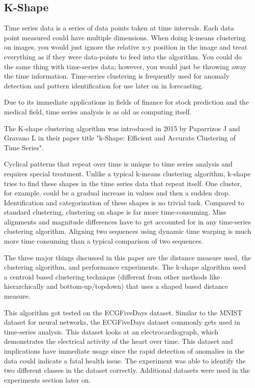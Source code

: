 \documentclass[12pt]{apa6}
\begin{document}
\subsection{K-Shape}


Time series data is a series of data points taken at time intervals. Each data point measured could have multiple dimensions. When doing k-means clustering on images, you would just ignore the relative x-y position in the image and treat everything as if they were data-points to feed into the algorithm. You could do the same thing with time-series data; however, you would just be throwing away the time information. Time-series clustering is frequently used for anomaly detection and pattern identification for use later on in forecasting. 


Due to its immediate applications in fields of finance for stock prediction and the medical field, time series analysis is as old as computing itself.  


The K-shape clustering algorithm was introduced in 2015 by Paparrizos J and Gravano L in their paper title "k-Shape: Efficient and Accurate Clustering of Time Series"\cite{k-shape}. 

Cyclical patterns that repeat over time is unique to time series analysis and requires special treatment. Unlike a typical k-means clustering algorithm, k-shape tries to find these shapes in the time series data that repeat itself. One cluster, for example, could be a gradual increase in values and then a sudden drop. Identification and categorization of these shapes is no trivial task. Compared to standard clustering, clustering on shape is far more time-consuming. Miss alignments and magnitude differences have to get accounted for in any time-series clustering algorithm. Aligning two sequences using dynamic time warping is much more time consuming than a typical comparison of two sequences.


The three major things discussed in this paper are the distance measure used, the clustering algorithm, and performance experiments. The k-shape algorithm used a centroid based clustering technique (different from other methods like hierarchically and bottom-up/topdown) that uses a shaped based distance measure. 


This algorithm got tested on the ECGFiveDays dataset. Similar to the MNIST dataset for neural networks, the ECGFiveDays dataset commonly gets used in time-series analysis. This dataset looks at an electrocardiograph, which demonstrates the electrical activity of the heart over time. This dataset and implications have immediate usage since the rapid detection of anomalies in the data could indicate a fatal health issue. The experiment was able to identify the two different classes in the dataset correctly. Additional datasets were used in the experiments section later on. 
\end{document}
